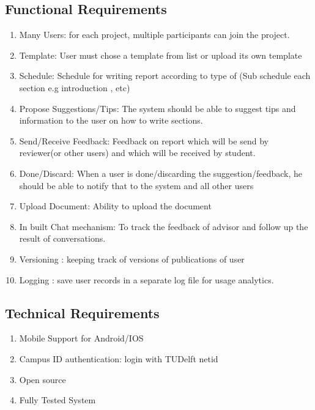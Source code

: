 \subsection{Functional Requirements} %
\label{sub:functional_requirement}
\begin{enumerate}
	\item Many Users: for each project, multiple participants can join the project.
	\item Template: User must chose a template from list or upload its own template
	\item Schedule: Schedule for writing report according to type of  (Sub schedule each section e.g introduction , etc)
	\item Propose Suggestions/Tips: The system should be able to suggest tips and information to the user on how to write sections.
	\item Send/Receive Feedback: Feedback on report which will be send by reviewer(or other users) and which will be received by student.
	\item Done/Discard: When a user is done/discarding the suggestion/feedback, he should be able to notify that to the system and all other users 
	\item Upload Document: Ability to upload the document
	\item In built Chat mechanism: To track the feedback of advisor and follow up the result of conversations. 
	\item Versioning : keeping track of versions of publications of user
	\item Logging : save user records in a separate log file for usage analytics.
\end{enumerate}

\subsection{Technical Requirements} %
\label{sub:technical_requirements}
\begin{enumerate}
	\item Mobile Support for Android/IOS
	\item Campus ID authentication: login with TUDelft netid
	\item Open source
 	\item Fully Tested System 
	 
\end{enumerate}


